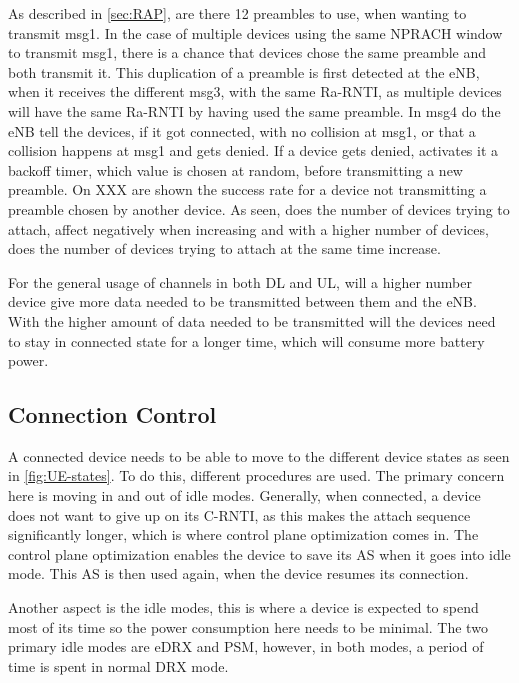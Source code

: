 As described in \autoref{sec:RAP}, are there 12 preambles to use, when wanting to transmit msg1. In the case of multiple devices using the same NPRACH window to transmit msg1, there is a chance that devices chose the same preamble and both transmit it. This duplication of a preamble is first detected at the eNB, when it receives the different msg3, with the same Ra-RNTI, as multiple devices will have the same Ra-RNTI by having used the same preamble. In msg4 do the eNB tell the devices, if it got connected, with no collision at msg1, or that a collision happens at msg1 and gets denied. If a device gets denied, activates it a backoff timer, which value is chosen at random, before transmitting a new preamble. On XXX are shown the success rate for a device not transmitting a preamble chosen by another device. As seen, does the number of devices trying to attach, affect negatively when increasing and with a higher number of devices, does the number of devices trying to attach at the same time increase.


For the general usage of channels in both DL and UL, will a higher number device give more data needed to be transmitted between them and the eNB. With the higher amount of data needed to be transmitted will the devices need to stay in connected state for a longer time, which will consume more battery power. 

\subsection{Connection Control}
A connected device needs to be able to move to the different device states as seen in \autoref{fig:UE-states}. To do this, different procedures are used. The primary concern here is moving in and out of idle modes. Generally, when connected, a device does not want to give up on its \gls{C-RNTI}, as this makes the attach sequence significantly longer, which is where control plane optimization comes in. The control plane optimization enables the device to save its \gls{AS} when it goes into idle mode. This \gls{AS} is then used again, when the device resumes its connection. 

Another aspect is the idle modes, this is where a device is expected to spend most of its time so the power consumption here needs to be minimal. The two primary idle modes are \gls{eDRX} and \gls{PSM}, however, in both modes, a period of time is spent in normal DRX mode. 


